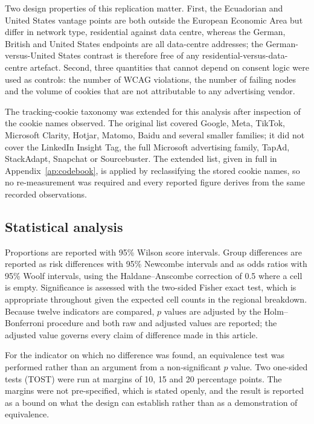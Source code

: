 \documentclass[pdflatex,sn-basic,Numbered]{sn-jnl}
\theoremstyle{thmstyleone}
\theoremstyle{thmstyletwo}
\theoremstyle{thmstylethree}
\begin{document}
Two design properties of this replication matter. First, the Ecuadorian and United States vantage points are both outside the European Economic Area but differ in network type, residential against data centre, whereas the German, British and United States endpoints are all data-centre addresses; the German-versus-United States contrast is therefore free of any residential-versus-data-centre artefact. Second, three quantities that cannot depend on consent logic were used as controls: the number of WCAG violations, the number of failing nodes and the volume of cookies that are not attributable to any advertising vendor.

The tracking-cookie taxonomy was extended for this analysis after inspection of the cookie names observed. The original list covered Google, Meta, TikTok, Microsoft Clarity, Hotjar, Matomo, Baidu and several smaller families; it did not cover the LinkedIn Insight Tag, the full Microsoft advertising family, TapAd, StackAdapt, Snapchat or Sourcebuster. The extended list, given in full in Appendix~\ref{ap:codebook}, is applied by reclassifying the stored cookie names, so no re-measurement was required and every reported figure derives from the same recorded observations.

\subsection{Statistical analysis}\label{sec:methods-stats}

Proportions are reported with 95\% Wilson score intervals. Group differences are reported as risk differences with 95\% Newcombe intervals and as odds ratios with 95\% Woolf intervals, using the Haldane--Anscombe correction of 0.5 where a cell is empty. Significance is assessed with the two-sided Fisher exact test, which is appropriate throughout given the expected cell counts in the regional breakdown. Because twelve indicators are compared, $p$ values are adjusted by the Holm--Bonferroni procedure and both raw and adjusted values are reported; the adjusted value governs every claim of difference made in this article.

For the indicator on which no difference was found, an equivalence test was performed rather than an argument from a non-significant $p$ value. Two one-sided tests (TOST) were run at margins of 10, 15 and 20 percentage points. The margins were not pre-specified, which is stated openly, and the result is reported as a bound on what the design can establish rather than as a demonstration of equivalence.
\end{document}
